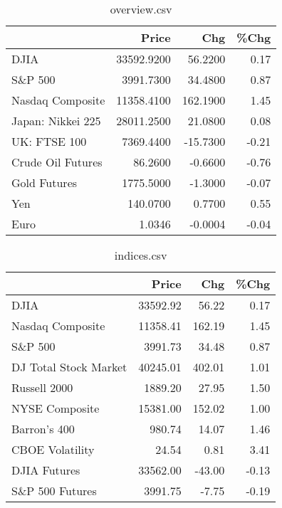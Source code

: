 \documentclass{article}%
\begin{document}
\begin{table}[htbp]%
\caption{overview.csv}%
\centering%
\begin{adjustbox}{width=1\textwidth}%
\begin{tabular}{lrrr}
\toprule
                  &      Price &      Chg &  \%Chg \\
\midrule
             DJIA & 33592.9200 &  56.2200 &  0.17 \\
          S\&P 500 &  3991.7300 &  34.4800 &  0.87 \\
 Nasdaq Composite & 11358.4100 & 162.1900 &  1.45 \\
Japan: Nikkei 225 & 28011.2500 &  21.0800 &  0.08 \\
     UK: FTSE 100 &  7369.4400 & -15.7300 & -0.21 \\
Crude Oil Futures &    86.2600 &  -0.6600 & -0.76 \\
     Gold Futures &  1775.5000 &  -1.3000 & -0.07 \\
              Yen &   140.0700 &   0.7700 &  0.55 \\
             Euro &     1.0346 &  -0.0004 & -0.04 \\
\bottomrule
\end{tabular}
%
\end{adjustbox}%
\end{table}

%


\begin{table}[htbp]%
\caption{indices.csv}%
\centering%
\begin{adjustbox}{width=1\textwidth}%
\begin{tabular}{lrrr}
\toprule
                      &    Price &    Chg &  \%Chg \\
\midrule
                 DJIA & 33592.92 &  56.22 &  0.17 \\
     Nasdaq Composite & 11358.41 & 162.19 &  1.45 \\
              S\&P 500 &  3991.73 &  34.48 &  0.87 \\
DJ Total Stock Market & 40245.01 & 402.01 &  1.01 \\
         Russell 2000 &  1889.20 &  27.95 &  1.50 \\
       NYSE Composite & 15381.00 & 152.02 &  1.00 \\
         Barron's 400 &   980.74 &  14.07 &  1.46 \\
      CBOE Volatility &    24.54 &   0.81 &  3.41 \\
         DJIA Futures & 33562.00 & -43.00 & -0.13 \\
      S\&P 500 Futures &  3991.75 &  -7.75 & -0.19 \\
\bottomrule
\end{tabular}
%
\end{adjustbox}%
\end{table}
\end{document}
